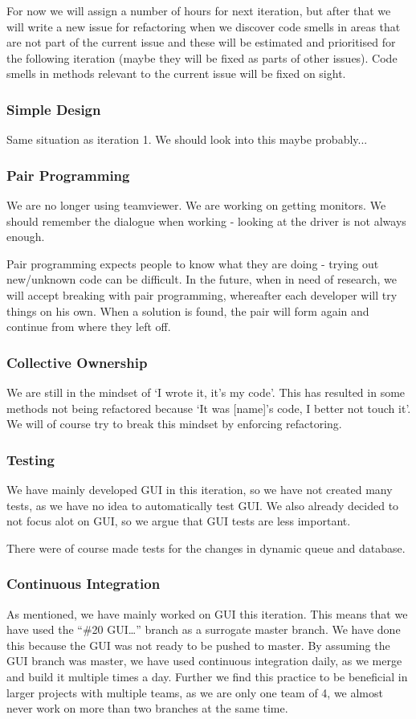 For now we will assign a number of hours for next iteration, but after that we will write a new issue for refactoring when we discover code smells in areas that are not part of the current issue and these will be estimated and prioritised for the following iteration (maybe they will be fixed as parts of other issues). Code smells in methods relevant to the current issue will be fixed on sight.

\subsubsection{Simple Design}
Same situation as iteration 1. We should look into this maybe probably...

\subsubsection{Pair Programming}
We are no longer using teamviewer. We are working on getting monitors.
We should remember the dialogue when working - looking at the driver is not always enough.

Pair programming expects people to know what they are doing - trying out new/unknown code can be difficult. In the future, when in need of research, we will accept breaking with pair programming, whereafter each developer will try things on his own. When a solution is found, the pair will form again and continue from where they left off.

\subsubsection{Collective Ownership}
We are still in the mindset of `I wrote it, it’s my code'. This has resulted in some methods not being refactored because `It was [name]’s code, I better not touch it'. We will of course try to break this mindset by enforcing refactoring.

\subsubsection{Testing}
We have mainly developed GUI in this iteration, so we have not created many tests, as we have no idea to automatically test GUI. We also already decided to not focus alot on GUI, so we argue that GUI tests are less important.

There were of course made tests for the changes in dynamic queue and database.

\subsubsection{Continuous Integration}
As mentioned, we have mainly worked on GUI this iteration. This means that we have used the ``\#20 GUI…'' branch as a surrogate master branch. We have done this because the GUI was not ready to be pushed to master. By assuming the GUI branch was master, we have used continuous integration daily, as we merge and build it multiple times a day.
Further we find this practice to be beneficial in larger projects with multiple teams, as we are only one team of 4, we almost never work on more than two branches at the same time. 
